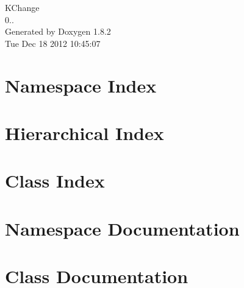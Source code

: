 \documentclass{book}
\begin{document}
\hypersetup{pageanchor=false,citecolor=blue}
\begin{titlepage}
\vspace*{7cm}
\begin{center}
{\Large K\-Change \\[1ex]\large 0.. }\\
\vspace*{1cm}
{\large Generated by Doxygen 1.8.2}\\
\vspace*{0.5cm}
{\small Tue Dec 18 2012 10:45:07}\\
\end{center}
\end{titlepage}
\clearemptydoublepage
{}
\tableofcontents
\clearemptydoublepage
{}
\hypersetup{pageanchor=true,citecolor=blue}
\chapter{Namespace Index}

\chapter{Hierarchical Index}

\chapter{Class Index}

\chapter{Namespace Documentation}




\chapter{Class Documentation}





















\printindex
\end{document}
